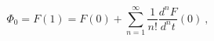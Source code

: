 \begin{equation}
\Phi_0=F(1)=F(0)+
\sum_{n=1}^{\infty}
\frac{1}{n!}
\frac{d^nF}{d^nt}(0) \ ,
\end{equation}

